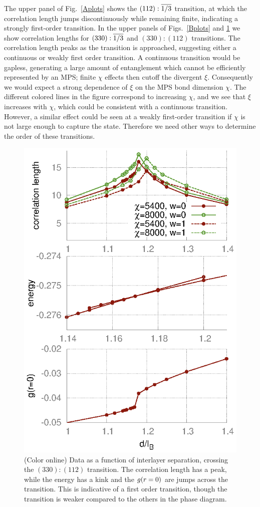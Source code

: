 The upper panel of Fig.~\ref{Aplots} shows the $(112):\overline{1/3}$ transition, at which the correlation length  jumps discontinuously while remaining finite, indicating a strongly first-order transition. 
In the upper panels of Figs.~\ref{Bplots} and \ref{Cplots} we show correlation lengths for $(330):\overline{1/3}$ and $(330):(112)$ transitions.
The correlation length peaks as the transition is approached, suggesting either a continuous or weakly first order transition.
A  continuous transition would be gapless, generating a large amount of entanglement which cannot be efficiently represented by an MPS; finite $\chi$ effects then cutoff the divergent $\xi$.
Consequently we would expect  a strong dependence of $\xi$ on the MPS bond dimension $\chi$.
The different colored lines in the figure correspond to increasing $\chi$, and we  see that $\xi$ increases with $\chi$, which could be consistent with a continuous transition. 
However, a similar effect could be seen at a weakly first-order transition if $\chi$ is not large enough to capture the state.
Therefore we need other ways to determine the order of these transitions.
 
\begin{figure}[ttt]
	\includegraphics[width=0.6\linewidth]{figures/C.eps}
	\caption{\label{Cplots} (Color online) Data as a function of interlayer separation, crossing the $(330):(112)$ transition. The correlation length has a peak, while the energy has a kink and the ${g}(r=0)$ are jumps across the transition. This is indicative of a first order transition, though the transition is weaker compared to the others in the phase diagram. }
\end{figure}

